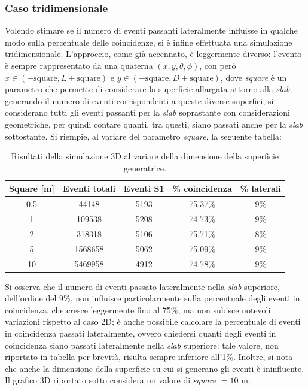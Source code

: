 \subsubsection{Caso tridimensionale}
Volendo stimare se il numero di eventi passanti lateralmente influisse in qualche modo sulla percentuale delle coincidenze, si è infine effettuata una simulazione tridimensionale. L'approccio, come già accennato, è leggermente diverso: l'evento è sempre rappresentato da una quaterna $(x,y,\theta,\phi)$, con però $x\in (-\mbox{square}, L+\mbox{square})$ e $y\in (-\mbox{square}, D+\mbox{square})$, dove \emph{square} è un parametro che permette di considerare la superficie allargata attorno alla \emph{slab}; generando il numero di eventi corrispondenti a queste diverse superfici, si considerano tutti gli eventi passanti per la \emph{slab} soprastante con considerazioni geometriche, per quindi contare quanti, tra questi, siano passati anche per la \emph{slab} sottostante.
Si riempie, al variare del parametro \emph{square}, la seguente tabella:
\begin{table}[h]
	\caption{Risultati della simulazione 3D al variare della dimensione della superficie generatrice.}
	\centering
	\begin{tabular}{ccccc}
		\toprule
		Square [m]& Eventi totali&Eventi S1& \% coincidenza &\% laterali	\\	
		\midrule
		0.5	&	44148		&	5193	&	75.37\%	& 9\%	\\
		1	&	109538	&	5208	&	74.73\%	& 9\% \\
		2	&	318318	& 	5106	&	75.71\%	& 8\% \\
		5	&	1568658	&	5062	&	75.09\%	& 9\% \\
		10	&	5469958	&	4912	&	74.78\%	& 9\%\\
		
		\bottomrule
	\end{tabular}
	\label{3D_sim}
\end{table}

Si osserva che il numero di eventi passato lateralmente nella \emph{slab} superiore, dell'ordine del 9\%, non influisce particolarmente sulla percentuale degli eventi in coincidenza, che cresce leggermente fino al 75\%, ma non subisce notevoli variazioni rispetto al caso 2D; è anche possibile calcolare la percentuale di eventi in coincidenza passati lateralmente, ovvero chiedersi quanti degli eventi in coincidenza siano passati lateralmente nella \emph{slab} superiore: tale valore, non riportato in tabella per brevità, risulta sempre inferiore all'1\%. Inoltre, si nota che anche la dimensione della superficie su cui si generano gli eventi è ininfluente. Il grafico 3D riportato sotto considera un valore di \emph{square} $=10$ m.

